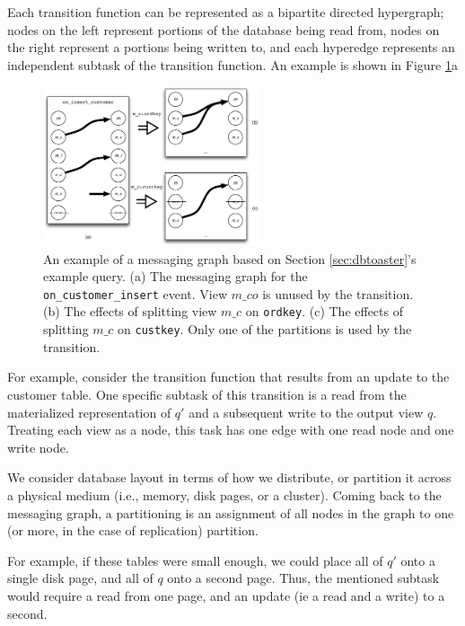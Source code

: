 Each transition function can be represented as a bipartite directed hypergraph; nodes on the left represent portions of the database being read from, nodes on the right represent a portions being written to, and each hyperedge represents an independent subtask of the transition function.  An example is shown in Figure \ref{fig:diag:messagingGraph}a

\begin{figure}
\begin{center}
\includegraphics[width=2.5in]{graphics/MessagingGraph}
\end{center}
\caption{An example of a messaging graph based on Section \ref{sec:dbtoaster}'s example query.  (a) The messaging graph for the \texttt{on\_customer\_insert} event.  View $m\_co$ is unused by the transition.  (b) The effects of splitting view $m\_c$ on \texttt{ordkey}.  (c) The effects of splitting $m\_c$ on \texttt{custkey}.  Only one of the partitions is used by the transition.}
\label{fig:diag:messagingGraph}
\end{figure}

For example, consider the transition function that results from an update to the customer table.  One specific subtask of this transition is a read from the materialized representation of $q'$ and a subsequent write to the output view $q$.  Treating each view as a node, this task has one edge with one read node and one write node.  

We consider database layout in terms of how we distribute, or partition it across a physical medium (i.e., memory, disk pages, or a cluster).  Coming back to the messaging graph, a partitioning is an assignment of all nodes in the graph to one (or more, in the case of replication) partition.  

For example, if these tables were small enough, we could place all of $q'$ onto a single disk page, and all of $q$ onto a second page.  Thus, the mentioned subtask would require a read from one page, and an update (ie a read and a write) to a second.  

